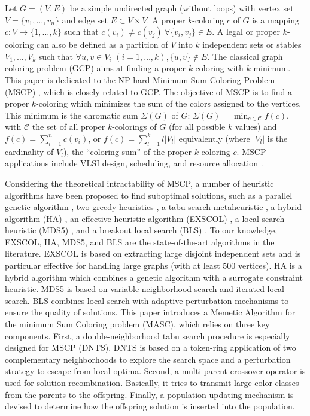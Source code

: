 \documentclass{elsart}
\begin{document}
Let $G = (V, E)$ be a simple undirected graph (without loops) with vertex set $V = \{v_1, \ldots , v_n\}$ and edge set $E \subset V \times V$. A proper $k$-coloring $c$ of $G$ is a mapping $c: V \to \{1, \ldots, k\}$ such that $c(v_i) \neq c(v_j)~\forall \{v_i, v_j\} \in E$. A legal or proper $k$-coloring can also be defined as a partition of $V$ into $k$ independent sets or stables $V_1, \ldots, V_k$ such that $\forall u,v \in V_i$ $(i=1, \ldots, k), \{u,v\} \notin E$. The classical graph coloring problem (GCP) aims at finding a proper $k$-coloring with $k$ minimum. 
This paper is dedicated to the NP-hard Minimum Sum Coloring Problem (MSCP) \cite{KubickaPhD1989,Kubicka&Schwenk1989}, which is closely related to GCP. The objective of MSCP is to find a proper $k$-coloring which minimizes the sum of the colors assigned to the vertices. This minimum is the chromatic sum $\Sigma(G)$ of $G$: $\Sigma(G)=\min_{c \in \mathcal{C}} f(c)$, with $\mathcal{C}$ the set of all proper $k$-colorings of $G$ (for all possible $k$ values) and $f(c) = \sum_{i=1}^n c(v_i)$, or $f(c) = \sum_{l=1}^k l|V_l|$ equivalently (where $|V_l|$ is the cardinality of $V_l$), the ``coloring sum'' of the proper $k$-coloring $c$. MSCP applications include VLSI design, scheduling, and resource allocation \cite{Malafiejski2004}.

Considering the theoretical intractability of MSCP, a number of heuristic algorithms have been proposed to find suboptimal solutions, such as a parallel genetic algorithm \cite{Kokosinski&Kwarciany2007}, two greedy heuristics \cite{Li&al2009}, a tabu search metaheuristic \cite{Bouziri&Jouini2010}, a hybrid algorithm (HA) \cite{Douiri&Elbernoussi2011}, an effective heuristic algorithm (EXSCOL) \cite{Wu&Hao2012}, a local search heuristic (MDS5) \cite{Helmar&Chiarandini2011}, and a breakout local search (BLS) \cite{Benlic&Hao2012}. To our knowledge, EXSCOL, HA, MDS5, and BLS are the state-of-the-art algorithms in the literature. EXSCOL is based on extracting large disjoint independent sets and is particular effective for handling large graphs (with at least 500 vertices). HA is a hybrid algorithm which combines a genetic algorithm with a surrogate constraint heuristic. MDS5 is based on variable neighborhood search and iterated local search. BLS combines local search with adaptive perturbation mechanisms to ensure the quality of solutions. 
This paper introduces a Memetic Algorithm for the minimum Sum Coloring problem (MASC), which relies on three key components. First, a double-neighborhood tabu search procedure is especially designed for MSCP (DNTS). DNTS is based on a token-ring application of two complementary neighborhoods to explore the search space and a perturbation strategy to escape from local optima. Second, a multi-parent crossover operator is used for solution recombination. Basically, it tries to transmit large color classes from the parents to the offspring. Finally, a population updating mechanism is devised to determine how the offspring solution is inserted into the population.
\end{document}
